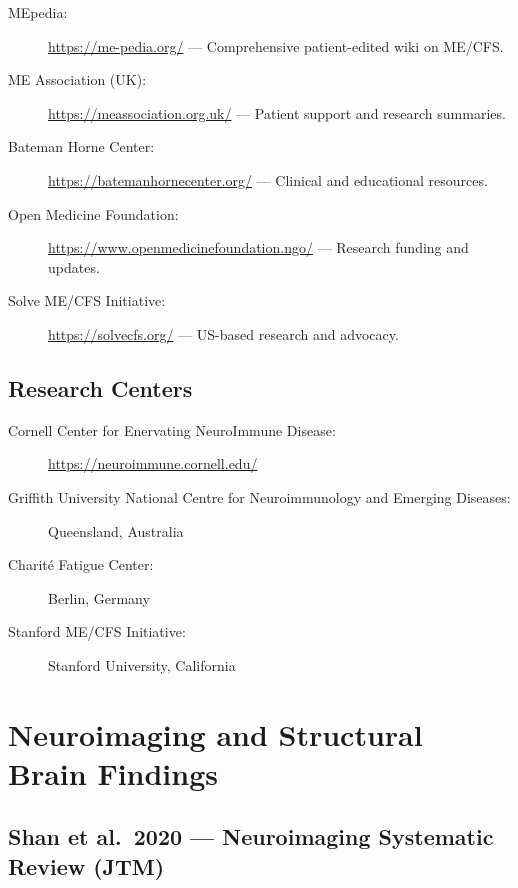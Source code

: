 \begin{description}
    \item[MEpedia:] \url{https://me-pedia.org/} --- Comprehensive patient-edited wiki on ME/CFS.
    \item[ME Association (UK):] \url{https://meassociation.org.uk/} --- Patient support and research summaries.
    \item[Bateman Horne Center:] \url{https://batemanhornecenter.org/} --- Clinical and educational resources.
    \item[Open Medicine Foundation:] \url{https://www.openmedicinefoundation.ngo/} --- Research funding and updates.
    \item[Solve ME/CFS Initiative:] \url{https://solvecfs.org/} --- US-based research and advocacy.
\end{description}

\subsection{Research Centers}

\begin{description}
    \item[Cornell Center for Enervating NeuroImmune Disease:] \url{https://neuroimmune.cornell.edu/}
    \item[Griffith University National Centre for Neuroimmunology and Emerging Diseases:] Queensland, Australia
    \item[Charit\'e Fatigue Center:] Berlin, Germany
    \item[Stanford ME/CFS Initiative:] Stanford University, California
\end{description}

\section{Neuroimaging and Structural Brain Findings}
\label{sec:bib-neuroimaging}

\subsection{Shan et al.\ 2020 --- Neuroimaging Systematic Review (JTM)}

